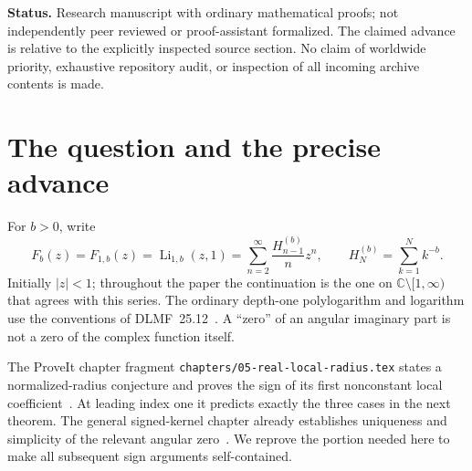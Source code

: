 \documentclass[11pt]{article}
\numberwithin{equation}{section}
\theoremstyle{definition}
\theoremstyle{remark}
\DeclareMathOperator{\Li}{Li}
\newcommand{\C}{\mathbb C}
\newcommand{\cut}{\C\setminus[1,\infty)}
\newcommand{\src}[1]{\nolinkurl{#1}}
\begin{document}
\begin{titlepage}
\begin{abstract}
We obtain an exact upper-half-plane parametrization, an all-circle cutoff
for $b\ge1$, a two-term radial correction, and opposite radial-curvature
signs at $b=2$ and $b=4$. An independent weight-generating identity yields
closed sums over every odd and every even inner order, including sums
at $z=-1$ and $z=1/4$. The package contains self-contained proofs,
18 rational root certificates, 1,938 exact finite regression checks,
five symbolic checks, numerical diagnostics, and an additive manuscript
fragment. The arguments do not resolve the remaining higher-outer-order
radial problem or the S6 and S8 arithmetic candidates.
\end{abstract}
\vfill
\noindent\textbf{Status.} Research manuscript with ordinary mathematical proofs;
not independently peer reviewed or proof-assistant formalized. The claimed
advance is relative to the explicitly inspected source section. No claim
of worldwide priority, exhaustive repository audit, or inspection of all
incoming archive contents is made.
\end{titlepage}

\begingroup
\small
\setlength{\parskip}{0pt}
\tableofcontents
\endgroup
\newpage

\section{The question and the precise advance}
\label{sec:intro}
For $b>0$, write
\begin{equation}\label{eq:Fdef}
 F_b(z)=F_{1,b}(z)=\Li_{1,b}(z,1)
 =\sum_{n=2}^{\infty}\frac{H_{n-1}^{(b)}}n z^n,
 \qquad H_N^{(b)}=\sum_{k=1}^N k^{-b}.
\end{equation}
Initially $|z|<1$; throughout the paper the continuation is the one on
$\cut$ that agrees with this series. The ordinary depth-one polylogarithm
and logarithm use the conventions of DLMF~25.12~\cite{dlmf}.
A ``zero'' of an angular imaginary part is not a zero of the complex
function itself.

The ProveIt chapter fragment
\src{chapters/05-real-local-radius.tex} states a normalized-radius
conjecture and proves the sign of its first nonconstant local
coefficient~\cite{repo-local}. At leading index one it predicts exactly
the three cases in the next theorem. The general signed-kernel chapter
already establishes uniqueness and simplicity of the relevant angular
zero~\cite{repo-signed}. We reprove the portion needed here to make all
subsequent sign arguments self-contained.
\end{document}
